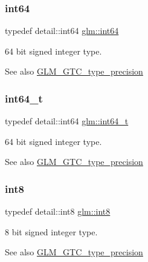\subsubsection{\texorpdfstring{int64}{int64}}
{\footnotesize\ttfamily typedef detail\+::int64 \hyperlink{group__gtc__type__precision_ga435d75819cce297cc5fa21bd84ef89a5}{glm\+::int64}}

64 bit signed integer type. \begin{DoxySeeAlso}{See also}
\hyperlink{group__gtc__type__precision}{G\+L\+M\+\_\+\+G\+T\+C\+\_\+type\+\_\+precision} 
\end{DoxySeeAlso}
\mbox{\label{group__gtc__type__precision_ga6abb23fbf4e39c50ec5341160b5da5ab}} 
\subsubsection{\texorpdfstring{int64\+\_\+t}{int64\_t}}
{\footnotesize\ttfamily typedef detail\+::int64 \hyperlink{group__gtc__type__precision_ga6abb23fbf4e39c50ec5341160b5da5ab}{glm\+::int64\+\_\+t}}

64 bit signed integer type. \begin{DoxySeeAlso}{See also}
\hyperlink{group__gtc__type__precision}{G\+L\+M\+\_\+\+G\+T\+C\+\_\+type\+\_\+precision} 
\end{DoxySeeAlso}
\mbox{\label{group__gtc__type__precision_ga96254f9c1c4506fc8eb5cf3301ce8565}} 
\subsubsection{\texorpdfstring{int8}{int8}}
{\footnotesize\ttfamily typedef detail\+::int8 \hyperlink{group__gtc__type__precision_ga96254f9c1c4506fc8eb5cf3301ce8565}{glm\+::int8}}

8 bit signed integer type. \begin{DoxySeeAlso}{See also}
\hyperlink{group__gtc__type__precision}{G\+L\+M\+\_\+\+G\+T\+C\+\_\+type\+\_\+precision} 
\end{DoxySeeAlso}
\mbox{\label{group__gtc__type__precision_ga673898d450b2a91186f3c4f40c5f8633}} 
